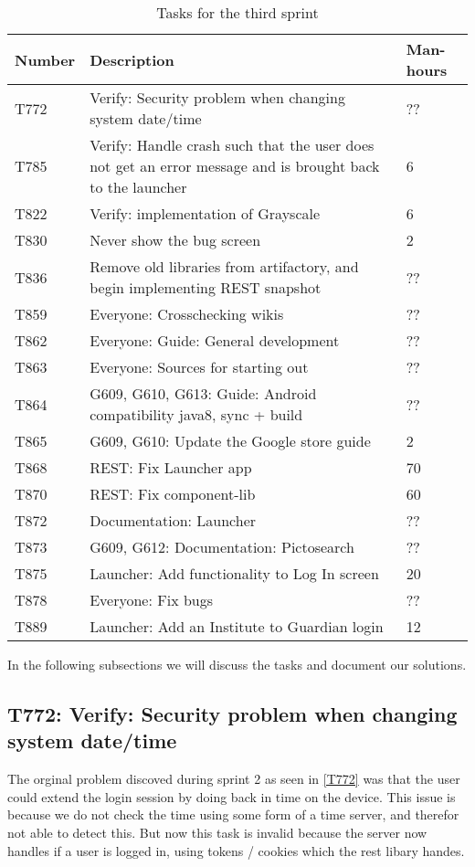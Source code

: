 \begin{table}[H]
\begin{centering}
\begin{tabular}{|l|p{9cm}|l|}
\hline
Number 	& Description & Man-hours \\ \hline
T772    & Verify: Security problem when changing system date/time & ??\\\hline
T785	& Verify: Handle crash such that the user does not get an error message and
is brought back to the launcher & 6\\ \hline
T822    & Verify: implementation of Grayscale & 6\\\hline
T830    & Never show the bug screen & 2 \\\hline
T836	& Remove old libraries from artifactory, and begin implementing REST
snapshot & ??\\\hline
T859   	& Everyone: Crosschecking wikis & ??\\\hline
T862  	& Everyone: Guide: General development & ?? \\ \hline
T863	& Everyone: Sources for starting out & ??\\ \hline
T864	& G609, G610, G613: Guide: Android compatibility java8, sync + build & ??\\
\hline 
T865	& G609, G610: Update the Google store guide & 2\\\hline
T868    & REST: Fix Launcher app & 70 \\\hline
T870    & REST: Fix component-lib & 60\\\hline
T872 	& Documentation: Launcher & ??\\ \hline
T873 	& G609, G612: Documentation: Pictosearch & ??\\ \hline
T875 	& Launcher: Add functionality to Log In screen & 20\\\hline 
T878 	& Everyone: Fix bugs & ??\\ \hline
T889	& Launcher: Add an Institute to Guardian login & 12 \\\hline
\end{tabular}
\caption{Tasks for the third sprint}
\label{Tasks3}
\end{centering}
\end{table}

In the following subsections we will discuss the tasks and document our
solutions.


\subsection{T772: Verify: Security problem when changing system date/time}
The orginal problem discoved during sprint 2 as seen in \autoref{T772} was that
the user could extend the login session by doing back in time on the device.
This issue is because we do not check the time using some form of a time server,
and therefor not able to detect this.  
But now this task is invalid because the server now handles if a user is logged
in, using tokens / cookies which the rest libary handes.


